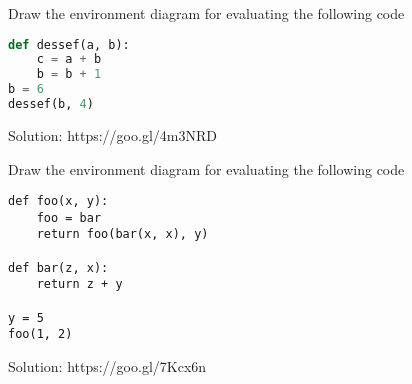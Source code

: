 \question
Draw the environment diagram for evaluating the following code
\begin{lstlisting}[language=Python]
def dessef(a, b):
    c = a + b
    b = b + 1
b = 6
dessef(b, 4)
\end{lstlisting}

\begin{solution}[2in]
Solution: https://goo.gl/4m3NRD
\end{solution}

\question
Draw the environment diagram for evaluating the following code
\begin{lstlisting}
def foo(x, y):
    foo = bar
    return foo(bar(x, x), y)
	
def bar(z, x):
    return z + y
	
y = 5
foo(1, 2)
\end{lstlisting}
\begin{solution}[2.5in]
Solution: 	https://goo.gl/7Kcx6n
\end{solution}


	



